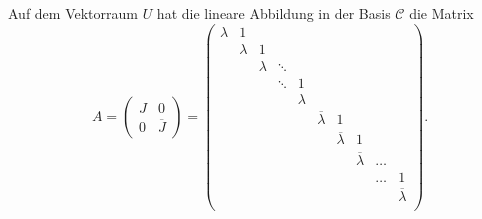 Auf dem Vektorraum $U$ hat die lineare Abbildung in der Basis
$\mathcal{C}$ die Matrix
\[
A=
\begin{pmatrix}
J&0\\
0&\overline{J}
\end{pmatrix}
=
\begin{pmatrix}
\lambda&   1   &       &      &       &&&&&\\
       &\lambda&   1   &      &       &&&&&\\
       &       &\lambda&\ddots&       &&&&&\\
       &       &       &\ddots&   1   &&&&&\\
       &       &       &      &\lambda&&&&&\\
&&&& &\overline{\lambda}&1&&     & \\
&&&& &&\overline{\lambda}&1&     & \\
&&&& &&&\overline{\lambda} &\dots& \\
&&&& &&&                   &\dots&1\\
&&&& &&&                   &&\overline{\lambda}\\
\end{pmatrix}.
\]

